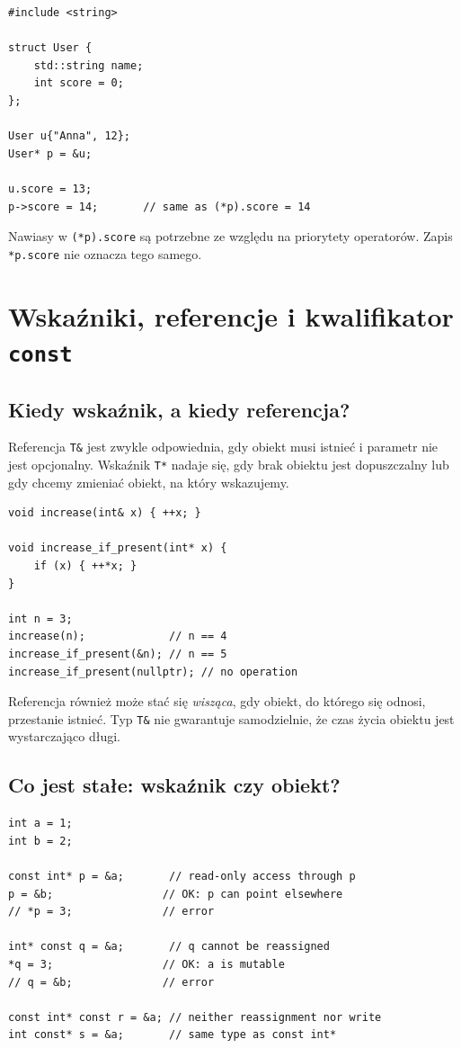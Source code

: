 \begin{lstlisting}
#include <string>

struct User {
    std::string name;
    int score = 0;
};

User u{"Anna", 12};
User* p = &u;

u.score = 13;
p->score = 14;       // same as (*p).score = 14
\end{lstlisting}

Nawiasy w \texttt{(*p).score} są potrzebne ze względu na priorytety
operatorów. Zapis \texttt{*p.score} nie oznacza tego samego.

\section{Wskaźniki, referencje i kwalifikator \texttt{const}}

\subsection{Kiedy wskaźnik, a kiedy referencja?}

Referencja \texttt{T\&} jest zwykle odpowiednia, gdy obiekt musi
istnieć i parametr nie jest opcjonalny. Wskaźnik \texttt{T*} nadaje
się, gdy brak obiektu jest dopuszczalny lub gdy chcemy zmieniać
obiekt, na który wskazujemy.

\begin{lstlisting}
void increase(int& x) { ++x; }

void increase_if_present(int* x) {
    if (x) { ++*x; }
}

int n = 3;
increase(n);             // n == 4
increase_if_present(&n); // n == 5
increase_if_present(nullptr); // no operation
\end{lstlisting}

Referencja również może stać się \emph{wisząca}, gdy obiekt,
do którego się odnosi, przestanie istnieć. Typ \texttt{T\&}
nie gwarantuje samodzielnie, że czas życia obiektu jest wystarczająco długi.

\subsection{Co jest stałe: wskaźnik czy obiekt?}

\begin{lstlisting}
int a = 1;
int b = 2;

const int* p = &a;       // read-only access through p
p = &b;                 // OK: p can point elsewhere
// *p = 3;              // error

int* const q = &a;       // q cannot be reassigned
*q = 3;                 // OK: a is mutable
// q = &b;              // error

const int* const r = &a; // neither reassignment nor write
int const* s = &a;       // same type as const int*
\end{lstlisting}

